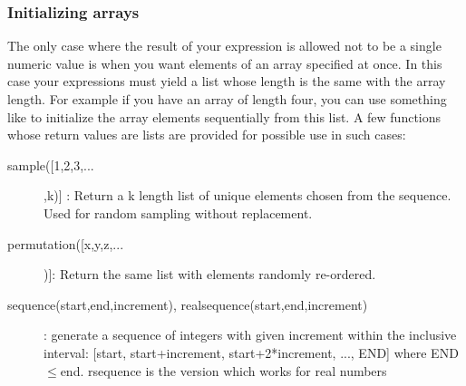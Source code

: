 \documentclass{article}
\begin{document}
\subsubsection{Initializing arrays}
\label{sec:arrayinit}
The only case where the result of your expression is allowed not to be a single numeric value is when you want elements of an array specified at once. In this case your expressions must yield a list whose length is the same with the array length. For example if you have an array of length four, you can use something like \example{[1,2,3,4]} to initialize the array elements sequentially from this list. A few functions whose return values are lists are provided for possible use in such cases:
\begin{description}  
   \item[sample([1,2,3,...],k)] : Return a k length list of unique elements chosen from the sequence. Used for random sampling without replacement.
   \item[permutation([x,y,z,...])]: Return the same list with elements randomly re-ordered.
   \item[sequence(start,end,increment), realsequence(start,end,increment)] : generate a sequence of integers with given increment within the inclusive interval: [start, start+increment, start+2*increment, ..., END] where END$\le$end. rsequence is the version which works for real numbers
\end{description}
\end{document}
